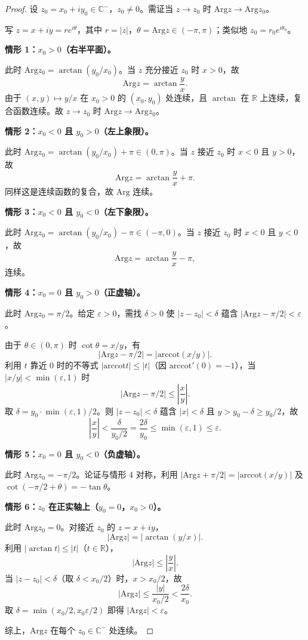 \documentclass[11pt,a4paper]{article}
\newcommand{\R}{\mathbb{R}}
\newcommand{\C}{\mathbb{C}}
\newcommand{\Arg}{\mathrm{Arg}}
\newcommand{\arccot}{\mathrm{arccot}}
\theoremstyle{definition}
\begin{document}
\begin{proof}
设 $z_0 = x_0 + iy_0 \in \C^-$，$z_0 \ne 0$。需证当 $z \to z_0$ 时 $\Arg z \to \Arg z_0$。

写 $z = x + iy = re^{i\theta}$，其中 $r = |z|$，$\theta = \Arg z \in (-\pi, \pi)$；类似地 $z_0 = r_0 e^{i\theta_0}$。

\textbf{情形 1：$x_0 > 0$（右半平面）。}

此时 $\Arg z_0 = \arctan(y_0/x_0)$。当 $z$ 充分接近 $z_0$ 时 $x > 0$，故
\[
  \Arg z = \arctan\frac{y}{x}.
\]
由于 $(x,y) \mapsto y/x$ 在 $x_0 > 0$ 的 $(x_0,y_0)$ 处连续，且 $\arctan$ 在 $\R$ 上连续，复合函数连续。故 $z \to z_0$ 时 $\Arg z \to \Arg z_0$。

\textbf{情形 2：$x_0 < 0$ 且 $y_0 > 0$（左上象限）。}

此时 $\Arg z_0 = \arctan(y_0/x_0) + \pi \in (0,\pi)$。当 $z$ 接近 $z_0$ 时 $x < 0$ 且 $y > 0$，故
\[
  \Arg z = \arctan\frac{y}{x} + \pi.
\]
同样这是连续函数的复合，故 $\Arg$ 连续。

\textbf{情形 3：$x_0 < 0$ 且 $y_0 < 0$（左下象限）。}

此时 $\Arg z_0 = \arctan(y_0/x_0) - \pi \in (-\pi, 0)$。当 $z$ 接近 $z_0$ 时 $x < 0$ 且 $y < 0$，故
\[
  \Arg z = \arctan\frac{y}{x} - \pi,
\]
连续。

\textbf{情形 4：$x_0 = 0$ 且 $y_0 > 0$（正虚轴）。}

此时 $\Arg z_0 = \pi/2$。给定 $\varepsilon > 0$，需找 $\delta > 0$ 使 $|z - z_0| < \delta$ 蕴含 $|\Arg z - \pi/2| < \varepsilon$。

由于 $\theta \in (0,\pi)$ 时 $\cot\theta = x/y$，有
\[
  |\Arg z - \pi/2| = |\arccot(x/y)|.
\]
利用 $t$ 靠近 $0$ 时的不等式 $|\arccot t| \le |t|$（因 $\arccot'(0) = -1$），当 $|x/y| < \min(\varepsilon, 1)$ 时
\[
  |\Arg z - \pi/2| \le \left|\frac{x}{y}\right|.
\]
取 $\delta = y_0 \cdot \min(\varepsilon, 1)/2$。则 $|z - z_0| < \delta$ 蕴含 $|x| < \delta$ 且 $y > y_0 - \delta \ge y_0/2$，故
\[
  \left|\frac{x}{y}\right| < \frac{\delta}{y_0/2}
  = \frac{2\delta}{y_0}
  \le \min(\varepsilon, 1) \le \varepsilon.
\]

\textbf{情形 5：$x_0 = 0$ 且 $y_0 < 0$（负虚轴）。}

此时 $\Arg z_0 = -\pi/2$。论证与情形 4 对称，利用 $|\Arg z + \pi/2| = |\arccot(x/y)|$ 及 $\cot(-\pi/2 + \theta) = -\tan\theta$。

\textbf{情形 6：$z_0$ 在正实轴上（$y_0 = 0$，$x_0 > 0$）。}

此时 $\Arg z_0 = 0$。对接近 $z_0$ 的 $z = x + iy$，
\[
  |\Arg z| = |\arctan(y/x)|.
\]
利用 $|\arctan t| \le |t|$（$t \in \R$），
\[
  |\Arg z| \le \left|\frac{y}{x}\right|.
\]
当 $|z - z_0| < \delta$（取 $\delta < x_0/2$）时，$x > x_0/2$，故
\[
  |\Arg z| \le \frac{|y|}{x_0/2} < \frac{2\delta}{x_0}.
\]
取 $\delta = \min(x_0/2, x_0\varepsilon/2)$ 即得 $|\Arg z| < \varepsilon$。

综上，$\Arg z$ 在每个 $z_0 \in \C^-$ 处连续。
\end{proof}
\end{document}
